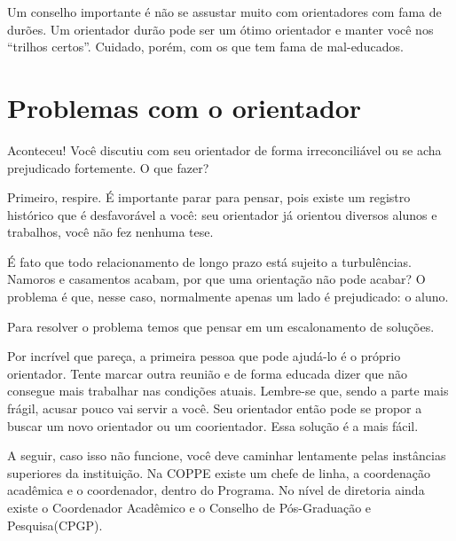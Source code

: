 Um conselho importante é não se assustar muito com orientadores com fama de durões. Um orientador durão pode ser um ótimo orientador e manter você nos “trilhos certos”. Cuidado, porém, com os que tem fama de mal-educados.


\section{Problemas com o orientador}


Aconteceu! Você discutiu com seu orientador de forma irreconciliável ou se acha prejudicado fortemente. O que fazer?


Primeiro, respire. É importante parar para pensar, pois existe um registro histórico que é desfavorável a você: seu orientador já orientou diversos alunos e trabalhos, você não fez nenhuma tese.


É fato que todo relacionamento de longo prazo está sujeito a turbulências. Namoros e casamentos acabam, por que uma orientação não pode acabar? O problema é que, nesse caso, normalmente apenas um lado é prejudicado: o aluno.


Para resolver o problema temos que pensar em um escalonamento de soluções. 


Por incrível que pareça, a primeira pessoa que pode ajudá-lo é o próprio orientador. Tente marcar outra reunião e de forma educada dizer que não consegue mais trabalhar nas condições atuais. Lembre-se que, sendo a parte mais frágil, acusar pouco vai servir a você. Seu orientador então pode se propor a buscar um novo orientador ou um coorientador. Essa solução é a mais fácil.


A seguir, caso isso não funcione, você deve caminhar lentamente pelas instâncias superiores da instituição. Na COPPE existe um chefe de linha, a coordenação acadêmica e o coordenador, dentro do Programa. No nível de diretoria ainda existe o Coordenador Acadêmico e o Conselho de Pós-Graduação e Pesquisa(CPGP).



